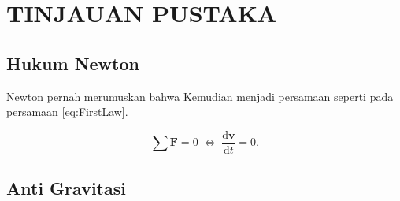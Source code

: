 \section{TINJAUAN PUSTAKA}


\subsection{Hukum Newton}

Newton pernah merumuskan \citep{Newton1687} bahwa \lipsum[8]
Kemudian menjadi persamaan seperti pada persamaan \ref{eq:FirstLaw}.

\begin{equation}
  \label{eq:FirstLaw}
  \sum \mathbf{F} = 0\; \Leftrightarrow\; \frac{\mathrm{d} \mathbf{v} }{\mathrm{d}t} = 0.
\end{equation}

\lipsum[9]

\subsection{Anti Gravitasi}

\lipsum[10]
